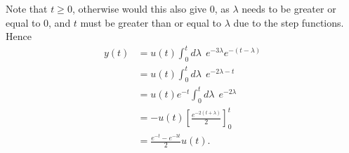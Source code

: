 Note that $t\geq 0$, otherwise would this also give 0, as $\lambda$ needs to 
be greater or equal to 0, and $t$ must be greater than or equal to $\lambda$ 
due to the step functions. Hence
\begin{align}
    y(t)&= u(t)\int_0^t d\lambda \ \ e^{-3\lambda}e^{-(t-\lambda)}\\
    &= u(t)\int^t_0 d\lambda \ \ e^{-2\lambda - t} \\
    &= u(t)e^{-t}\int_0^td\lambda \ \ e^{-2\lambda}\\ 
    &= -u(t)\left[\frac{e^{-2(t + \lambda)}}{2}\right]_0^t\\ 
    &= \frac{e^{-t} - e^{-3t}}{2}u(t).
\end{align}
